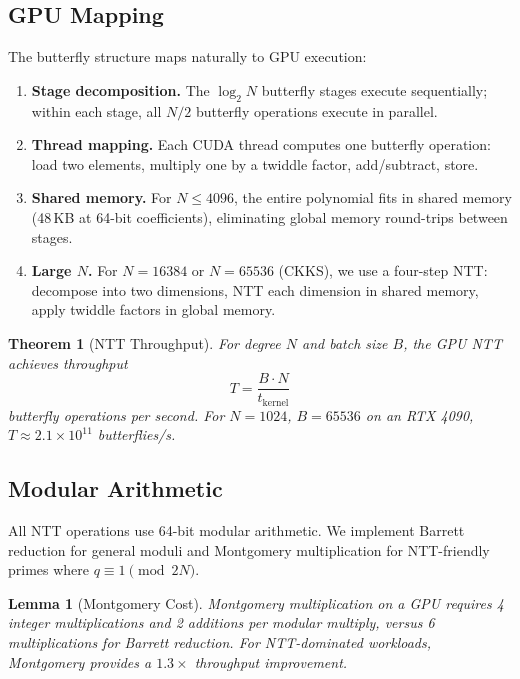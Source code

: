 \documentclass[11pt,a4paper]{article}
\newtheorem{theorem}{Theorem}[section]
\newtheorem{lemma}{Lemma}[section]
\begin{document}
\subsection{GPU Mapping}

The butterfly structure maps naturally to GPU execution:

\begin{enumerate}
    \item \textbf{Stage decomposition.}  The $\log_2 N$ butterfly stages
    execute sequentially; within each stage, all $N/2$ butterfly
    operations execute in parallel.
    \item \textbf{Thread mapping.}  Each CUDA thread computes one
    butterfly operation: load two elements, multiply one by a twiddle
    factor, add/subtract, store.
    \item \textbf{Shared memory.}  For $N \leq 4096$, the entire
    polynomial fits in shared memory (48\,KB at 64-bit coefficients),
    eliminating global memory round-trips between stages.
    \item \textbf{Large $N$.}  For $N = 16384$ or $N = 65536$ (CKKS),
    we use a four-step NTT: decompose into two dimensions, NTT each
    dimension in shared memory, apply twiddle factors in global memory.
\end{enumerate}

\begin{theorem}[NTT Throughput]
    For degree $N$ and batch size $B$, the GPU NTT achieves throughput
    \[
        T = \frac{B \cdot N}{t_{\mathrm{kernel}}}
    \]
    butterfly operations per second.  For $N = 1024$, $B = 65536$ on
    an RTX 4090, $T \approx 2.1 \times 10^{11}$ butterflies/s.
\end{theorem}

\subsection{Modular Arithmetic}

All NTT operations use 64-bit modular arithmetic.  We implement
Barrett reduction for general moduli and Montgomery multiplication
for NTT-friendly primes where $q \equiv 1 \pmod{2N}$.

\begin{lemma}[Montgomery Cost]
    Montgomery multiplication on a GPU requires 4 integer multiplications
    and 2 additions per modular multiply, versus 6 multiplications for
    Barrett reduction.  For NTT-dominated workloads, Montgomery provides
    a $1.3\times$ throughput improvement.
\end{lemma}
\end{document}

